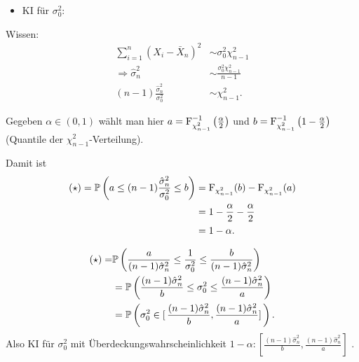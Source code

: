 \documentclass{tstextbook}
\begin{document}
\begin{example}[Normalverteilung]
	\newpage
	\begin{itemize} \item KI für $ \sigma_0^2 $: \end{itemize}
	
	Wissen: 
	\[
	\begin{aligned} 
		\sum_{i=1}^{n} (X_i-\bar{X}_n)^2 & \sim \sigma_0^2 \chi_{n-1}^2 \\
		\Rightarrow \hat{\sigma}_n^2 & \sim \frac{\sigma_0^2 \chi_{n-1}^2}{n-1}  \\
		(n-1) \frac{\hat{\sigma}_n^2}{\sigma_0^2} & \sim \chi_{n-1}^2 .
	\end{aligned}
	\]
	
	Gegeben $ \alpha \in (0,1) $  wählt man hier $ a = \operatorname{F}_{\chi_{n-1}^2}^{-1} \left(\frac{\alpha}{2}\right) $ und $ b = \operatorname{F}_{\chi_{n-1}^2}^{-1} \left(1-\frac{\alpha}{2}\right) $ (Quantile der $ \chi_{n-1}^2 $-Verteilung).
	
	Damit ist 
	\[
	\begin{aligned}
		(\star)  = \mathbb P\left(a\le (n-1) \frac{\hat{\sigma}_n^2}{\sigma_0^2} \le b \right) & = \operatorname{F}_{\chi_{n-1}^2}(b) - \operatorname{F}_{\chi_{n-1}^2}(a) \\
		& = 1 - \frac{\alpha}{2} - \frac{\alpha}{2} \\
		& = 1 - \alpha.
	\end{aligned}
	\]
	
	\[
	\begin{aligned}
		(\star)  = & \mathbb P\left(\frac{a}{(n-1)\hat{\sigma}_n^2} \le \frac{1}{\sigma_0^2} \le \frac{b}{(n-1)\hat{\sigma}_n^2} \right) \\
		& = \mathbb P\left(\frac{(n-1)\hat{\sigma}_n^2}{b} \le \sigma_0^2 \le \frac{(n-1)\hat{\sigma}_n^2}{a} \right)\\
		& = \mathbb P\left(\sigma_0^2 \in [ \, \frac{(n-1)\hat{\sigma}_n^2}{b}, \frac{(n-1)\hat{\sigma}_n^2}{a}   ] \, \right).
	\end{aligned}
	\]
	Also KI für $ \sigma_0^2 $ mit Überdeckungswahrscheinlichkeit $1 - \alpha: \left[\frac{(n-1)\hat{\sigma}_n^2}{b}, \frac{(n-1)\hat{\sigma}_n^2}{a} \right] $ .
\end{example}
\end{document}
